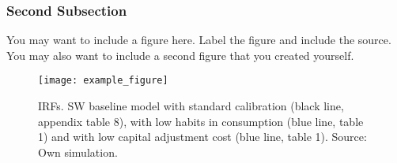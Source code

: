 \begin{table}[H]
	\centering
	\caption[Example table (short description)]{An example table. Describe it shortly. Source: Smets \& Wouters (2007): 597.}
\end{table}
\newpage
 \subsubsection{Second Subsection}
You may want to include a figure here. Label the figure and include the source. You may also want to include a second figure that you created yourself.
 \begin{figure}[H]
 	\texttt{[image: example\_figure]}
 	\caption[Short description]{IRFs. SW baseline model with standard calibration (black line, appendix table 8), with low habits in consumption (blue line, table 1) and with low capital adjustment cost (blue line, table 1). Source: Own simulation.}
 \end{figure}
\newpage
